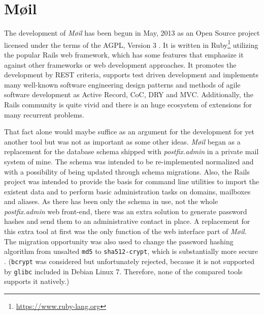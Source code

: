 \documentclass[12pt,a4paper]{scrartcl}
\begin{document}
	\section{Møil}
	\label{sec:moeil}
		The development of \emph{Møil} has been begun in May, 2013 as an Open
		Source project licensed under the terms of the AGPL, Version 3
		\cite{agpl}. It is written in
		Ruby\footnote{\url{https://www.ruby-lang.org}} utilizing the popular
		\ac{Rails} web framework, which has some features that emphasize it
		against other frameworks or web development approaches. It promotes the
		development by \acs{REST} \cite{rest} criteria, supports test driven
		development and implements many well-known software engineering design
		patterns and methods of agile software development as Active Record,
		\ac{CoC}, \ac{DRY} and \ac{MVC}. Additionally, the \ac{Rails}
		community is quite vivid and there is an huge ecosystem of extensions
		for many recurrent problems.


		That fact alone would maybe suffice as an argument for the development
		for yet another tool but was not as important as some other ideas.
		\emph{Møil} began as a replacement for the database schema shipped with
		\emph{postfix.admin} in a private mail system of mine. The schema was
		intended to be re-implemented normalized \cite{dbnorm} and with a
		possibility of being updated through schema migrations. Also, the
		\ac{Rails} project was intended to provide the basis for command line
		utilities to import the existent data and to perform basic
		administration tasks on domains, mailboxes and aliases. As there has
		been only the schema in use, not the whole \emph{postfix.admin} web
		front-end, there was an extra solution to generate password hashes and
		send them to an administrative contact in place. A replacement for this
		extra tool at first was the only function of the web interface part of
		\emph{Møil}. The migration opportunity was also used to change the
		password hashing algorithm from unsalted \texttt{md5} to
		\texttt{sha512-crypt}, which is substantially more secure
		\cite{missing}. (\texttt{bcrypt} was considered but unfortunately
		rejected, because it is not supported by \texttt{glibc} included in
		Debian Linux 7. Therefore, none of the compared tools supports it
		natively.)

\end{document}
